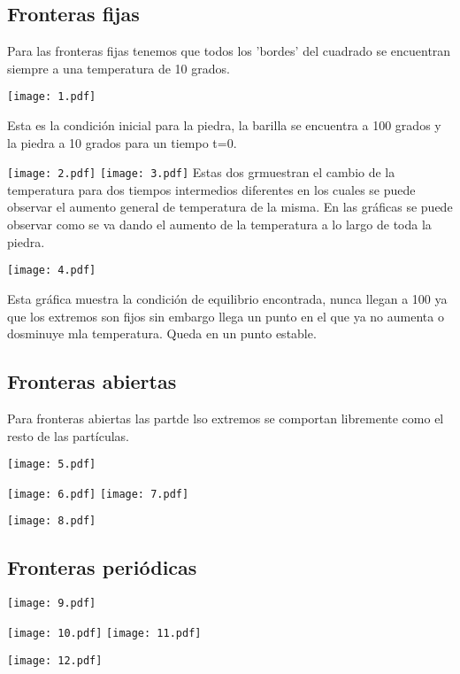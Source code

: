\documentclass[a4paper,11pt]{article}
\begin{document}
\subsection{Fronteras fijas}

Para las fronteras fijas tenemos que todos los 'bordes' del cuadrado se encuentran siempre a una temperatura de 10 grados.

\begin{center}
\texttt{[image: 1.pdf]}
\end{center}
Esta es la condici\'on inicial para la piedra, la barilla se encuentra a 100 grados y la piedra a 10 grados para un tiempo t=0.

\texttt{[image: 2.pdf]}
\texttt{[image: 3.pdf]}
Estas dos gr\aficas muestran el cambio de la temperatura para dos tiempos intermedios diferentes en los cuales se puede observar el aumento general de temperatura de la misma. En las gr\'aficas se puede observar como se va dando el aumento de la temperatura a lo largo de toda la piedra.

\begin{center}
\texttt{[image: 4.pdf]}
\end{center}
Esta gr\'afica muestra la condici\'on de equilibrio encontrada, nunca llegan a 100 ya que los extremos son fijos sin embargo llega un punto en el que ya no aumenta o dosminuye m\as la temperatura. Queda en un punto estable.

\subsection{Fronteras abiertas}
Para fronteras abiertas las part\iculas de lso extremos se comportan libremente como el resto de las part\'iculas.

\begin{center}
\texttt{[image: 5.pdf]}
\end{center}

\texttt{[image: 6.pdf]}
\texttt{[image: 7.pdf]}

\begin{center}
\texttt{[image: 8.pdf]}
\end{center}


\subsection{Fronteras peri\'odicas}
\begin{center}
\texttt{[image: 9.pdf]}
\end{center}

\texttt{[image: 10.pdf]}
\texttt{[image: 11.pdf]}

\begin{center}
\texttt{[image: 12.pdf]}
\end{center}
\end{document}

